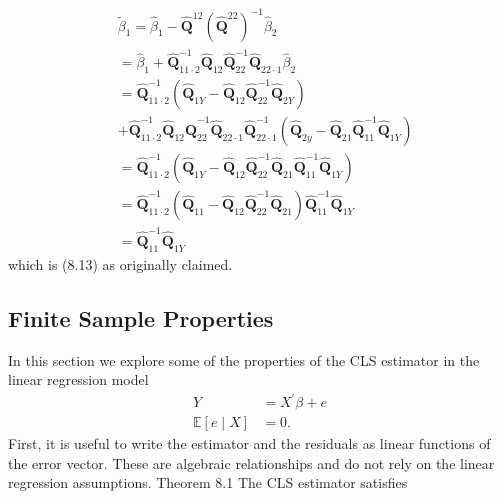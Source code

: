 \documentclass[10pt]{article}
\begin{document}
$$
\begin{aligned}
& \widetilde{\beta}_{1}=\widehat{\beta}_{1}-\widehat{\boldsymbol{Q}}^{12}\left(\widehat{\boldsymbol{Q}}^{22}\right)^{-1} \widehat{\beta}_{2} \\
& =\widehat{\beta}_{1}+\widehat{\boldsymbol{Q}}_{11 \cdot 2}^{-1} \widehat{\boldsymbol{Q}}_{12} \widehat{\boldsymbol{Q}}_{22}^{-1} \widehat{\boldsymbol{Q}}_{22 \cdot 1} \widehat{\beta}_{2} \\
& =\widehat{\boldsymbol{Q}}_{11 \cdot 2}^{-1}\left(\widehat{\boldsymbol{Q}}_{1 Y}-\widehat{\boldsymbol{Q}}_{12} \widehat{\boldsymbol{Q}}_{22}^{-1} \widehat{\boldsymbol{Q}}_{2 Y}\right) \\
& +\widehat{\boldsymbol{Q}}_{11 \cdot 2}^{-1} \widehat{\boldsymbol{Q}}_{12} \widehat{\boldsymbol{Q}}_{22}^{-1} \widehat{\boldsymbol{Q}}_{22 \cdot 1} \widehat{\boldsymbol{Q}}_{22 \cdot 1}^{-1}\left(\widehat{\boldsymbol{Q}}_{2 y}-\widehat{\boldsymbol{Q}}_{21} \widehat{\boldsymbol{Q}}_{11}^{-1} \widehat{\boldsymbol{Q}}_{1 Y}\right) \\
& =\widehat{\boldsymbol{Q}}_{11 \cdot 2}^{-1}\left(\widehat{\boldsymbol{Q}}_{1 Y}-\widehat{\boldsymbol{Q}}_{12} \widehat{\boldsymbol{Q}}_{22}^{-1} \widehat{\mathbf{Q}}_{21} \widehat{\boldsymbol{Q}}_{11}^{-1} \widehat{\boldsymbol{Q}}_{1 Y}\right) \\
& =\widehat{\boldsymbol{Q}}_{11 \cdot 2}^{-1}\left(\widehat{\boldsymbol{Q}}_{11}-\widehat{\boldsymbol{Q}}_{12} \widehat{\boldsymbol{Q}}_{22}^{-1} \widehat{\boldsymbol{Q}}_{21}\right) \widehat{\boldsymbol{Q}}_{11}^{-1} \widehat{\boldsymbol{Q}}_{1 Y} \\
& =\widehat{\boldsymbol{Q}}_{11}^{-1} \widehat{\boldsymbol{Q}}_{1 Y}
\end{aligned}
$$
which is (8.13) as originally claimed.

\subsection{Finite Sample Properties}
In this section we explore some of the properties of the CLS estimator in the linear regression model
$$
\begin{aligned}
Y &=X^{\prime} \beta+e \\
\mathbb{E}[e \mid X] &=0 .
\end{aligned}
$$
First, it is useful to write the estimator and the residuals as linear functions of the error vector. These are algebraic relationships and do not rely on the linear regression assumptions. Theorem 8.1 The CLS estimator satisfies
\end{document}
